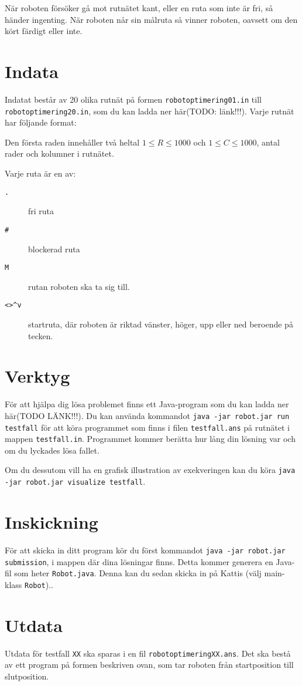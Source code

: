 När roboten försöker gå mot rutnätet kant, eller en ruta som inte är fri, så händer ingenting. När roboten når sin målruta så vinner roboten, oavsett om den kört färdigt eller inte.

\section*{Indata}
Indatat består av 20 olika rutnät på formen \texttt{robotoptimering01.in} till \texttt{robotoptimering20.in}, som du kan ladda ner här(TODO: länk!!!). Varje rutnät har följande format:

Den första raden innehåller två heltal $1 \le R \le 1000$ och $1 \le C \le 1000$, antal rader och kolumner i rutnätet.

Varje ruta är en av:
\begin{description}
  \item[\texttt{.}] fri ruta
  \item[\texttt{#}] blockerad ruta
  \item[\texttt{M}] rutan roboten ska ta sig till.
  \item[\texttt{<>^v}] startruta, där roboten är riktad vänster, höger, upp eller ned beroende på tecken.
\end{description}

\section*{Verktyg}
För att hjälpa dig lösa problemet finns ett Java-program som du kan ladda ner här(TODO LÄNK!!!). Du kan använda kommandot \texttt{java -jar robot.jar run testfall} för att köra programmet som finns i filen \texttt{testfall.ans} på rutnätet i mappen \texttt{testfall.in}. Programmet kommer berätta hur lång din lösning var och om du lyckades lösa fallet.

Om du dessutom vill ha en grafisk illustration av exekveringen kan du köra \texttt{java -jar robot.jar visualize testfall}.

\section*{Inskickning}
För att skicka in ditt program kör du först kommandot \texttt{java -jar robot.jar submission}, i mappen där dina lösningar finns. Detta kommer generera en Java-fil som heter \texttt{Robot.java}. Denna kan du sedan skicka in på Kattis (välj main-klass \texttt{Robot})..

\section*{Utdata}
Utdata för testfall \texttt{XX} ska sparas i en fil \texttt{robotoptimeringXX.ans}. Det ska bestå av ett program på formen beskriven ovan, som tar roboten från startposition till slutposition.

